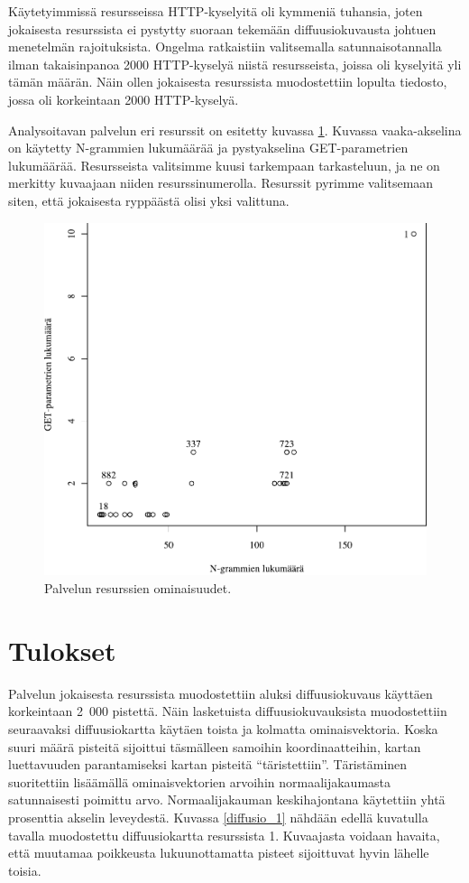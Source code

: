 Käytetyimmissä resursseissa HTTP-kyselyitä oli kymmeniä tuhansia, joten jokaisesta resurssista ei pystytty suoraan tekemään diffuusiokuvausta johtuen
menetelmän rajoituksista. Ongelma ratkaistiin valitsemalla satunnaisotannalla ilman takaisinpanoa 2000 HTTP-kyselyä niistä resursseista, joissa oli 
kyselyitä yli tämän määrän. Näin ollen jokaisesta resurssista muodostettiin lopulta tiedosto, jossa oli korkeintaan 2000 HTTP-kyselyä.

Analysoitavan palvelun eri resurssit on esitetty kuvassa \ref{service_resources}. Kuvassa vaaka-akselina on käytetty N-grammien lukumäärää ja 
pystyakselina GET-parametrien lukumäärää. Resursseista valitsimme kuusi tarkempaan tarkasteluun, ja ne on merkitty kuvaajaan niiden resurssinumerolla. 
Resurssit pyrimme valitsemaan siten, että jokaisesta ryppäästä olisi yksi valittuna.

\begin{figure}[ht]
\centering
\includegraphics[width=13cm]{pics/service_resources.pdf}
\caption{Palvelun resurssien ominaisuudet.}
\label{service_resources}
\end{figure}

\section{Tulokset}

Palvelun jokaisesta resurssista muodostettiin aluksi diffuusiokuvaus
käyttäen korkeintaan 2~000 pistettä. Näin lasketuista
diffuusiokuvauksista muodostettiin seuraavaksi diffuusiokartta käytäen
toista ja kolmatta ominaisvektoria.  Koska suuri määrä pisteitä
sijoittui täsmälleen samoihin koordinaatteihin, kartan luettavuuden
parantamiseksi kartan pisteitä ``täristettiin''. Täristäminen
suoritettiin lisäämällä ominaisvektorien arvoihin normaalijakaumasta
satunnaisesti poimittu arvo. Normaalijakauman keskihajontana
käytettiin yhtä prosenttia akselin leveydestä. Kuvassa
\ref{diffusio_1} nähdään edellä kuvatulla tavalla muodostettu
diffuusiokartta resurssista 1. Kuvaajasta voidaan havaita, että
muutamaa poikkeusta lukuunottamatta pisteet sijoittuvat hyvin lähelle
toisia.

